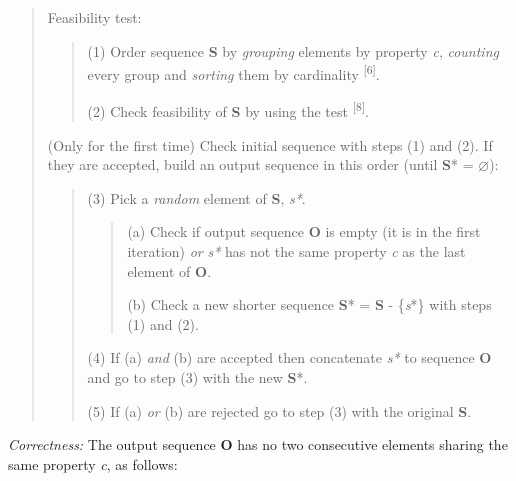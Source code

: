 \documentclass[12pt]{article}
\begin{document}
\begin{quote}
Feasibility test:

\begin{quote}
(1) Order sequence \textbf{S} by \textit{grouping} elements by property \textit{c}, 
\textit{counting} every group and \textit{sorting} them by cardinality \textsuperscript{[6]}.

(2) Check feasibility of \textbf{S} by using the test \textsuperscript{[8]}.
\end{quote}

(Only for the first time) Check initial sequence with steps (1) and (2). If they are accepted, 
build an output sequence in this order (until \textbf{S}* = $\varnothing$)\textsuperscript{\textdaggerdbl}:

\begin{quote}
(3) Pick a \textit{random} element of \textbf{S}, \textit{s*}.

\begin{quote}
(a) Check if output sequence \textbf{O} is empty (it is in the first iteration) 
\textit{or} \textit{s*} has not the same property \textit{c} as the last element 
of \textbf{O}.

(b) Check a new shorter sequence \textbf{S}* = \textbf{S} - \{\textit{s}*\} with 
steps (1) and (2).
\end{quote}

(4) If (a) \textit{and} (b) are accepted then concatenate \textit{s*} to sequence 
\textbf{O} and go to step (3) with the new \textbf{S}*.

(5) If (a) \textit{or} (b) are rejected go to step (3) with the original \textbf{S}.
\end{quote}
\end{quote}

\textit{Correctness:} The output sequence \textbf{O} has no two consecutive elements 
sharing the same property \textit{c}, as follows:
\end{document}
